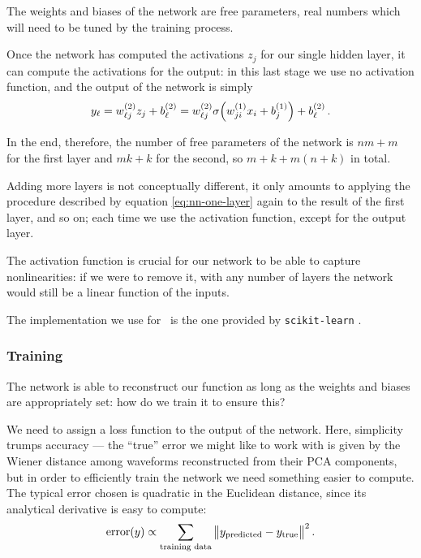 \documentclass[main.tex]{subfiles}
\begin{document}
The weights and biases of the network are free parameters, real numbers which will need to be tuned by the training process. 

Once the network has computed the activations \(z_j\) for our single hidden layer, it can compute the activations for the output: in this last stage we use no activation function, and the output of the network is simply 
%
\begin{align}
y_\ell = w^{(2)}_{\ell j} z_j + b^{(2)}_{\ell} 
= w^{(2)}_{\ell j} \sigma \qty( w^{(1)}_{ji} x_i + b^{(1)}_j ) + b^{(2)}_{\ell}
\,.
\end{align}

In the end, therefore, the number of free parameters of the network is \(nm + m\) for the first layer and \(mk + k\) for the second, so \(m + k + m (n+k)\) in total.

Adding more layers is not conceptually different, it only amounts to applying the procedure described by equation \ref{eq:nn-one-layer} again to the result of the first layer, and so on; each time we use the activation function, except for the output layer.

The activation function is crucial for our network to be able to capture nonlinearities: if we were to remove it, with any number of layers the network would still be a linear function of the inputs. 

The implementation we use for \mb \ is the one provided by \texttt{scikit-learn} \cite[]{pedregosaScikitlearnMachineLearning2011}. 

\subsubsection{Training}

The network is able to reconstruct our function as long as the weights and biases are appropriately set: how do we train it to ensure this? 

We need to assign a loss function to the output of the network.
Here, simplicity trumps accuracy --- the ``true'' error we might like to work with is given by the Wiener distance among waveforms reconstructed from their PCA components, but in order to efficiently train the network we need something easier to compute.
The typical error chosen is quadratic in the Euclidean distance, since its analytical derivative is easy to compute: 
%
\begin{align} \label{eq:quadratic-loss}
\text{error}(y) \propto \sum _{\text{training data}} 
\norm{y _{\text{predicted}} - y _{\text{true}}}^2
\,.
\end{align}
\end{document}

